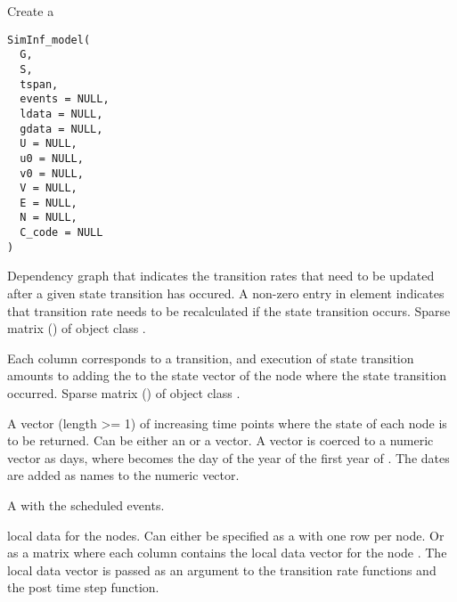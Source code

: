 \documentclass[letterpaper]{book}
\begin{document}
%
\begin{Description}
Create a 
\end{Description}
%
\begin{Usage}
\begin{verbatim}
SimInf_model(
  G,
  S,
  tspan,
  events = NULL,
  ldata = NULL,
  gdata = NULL,
  U = NULL,
  u0 = NULL,
  v0 = NULL,
  V = NULL,
  E = NULL,
  N = NULL,
  C_code = NULL
)
\end{verbatim}
\end{Usage}
%
\begin{Arguments}
\begin{ldescription}
\item[\code{G}] Dependency graph that indicates the transition rates that
need to be updated after a given state transition has occured.
A non-zero entry in element  indicates that
transition rate  needs to be recalculated if the state
transition  occurs. Sparse matrix ()
of object class
.

\item[\code{S}] Each column corresponds to a transition, and execution of
state transition  amounts to adding the 
to the state vector of the node where the state transition
occurred.  Sparse matrix () of object class
.

\item[\code{tspan}] A vector (length >= 1) of increasing time points
where the state of each node is to be returned. Can be either
an  or a  vector. A 
vector is coerced to a numeric vector as days, where
 becomes the day of the year of the first year
of . The dates are added as names to the numeric
vector.

\item[\code{events}] A  with the scheduled events.

\item[\code{ldata}] local data for the nodes. Can either be specified as
a  with one row per node. Or as a matrix
where each column  contains the local data
vector for the node . The local data vector is passed
as an argument to the transition rate functions and the post
time step function.


\end{ldescription}
\end{Arguments}
\end{document}
